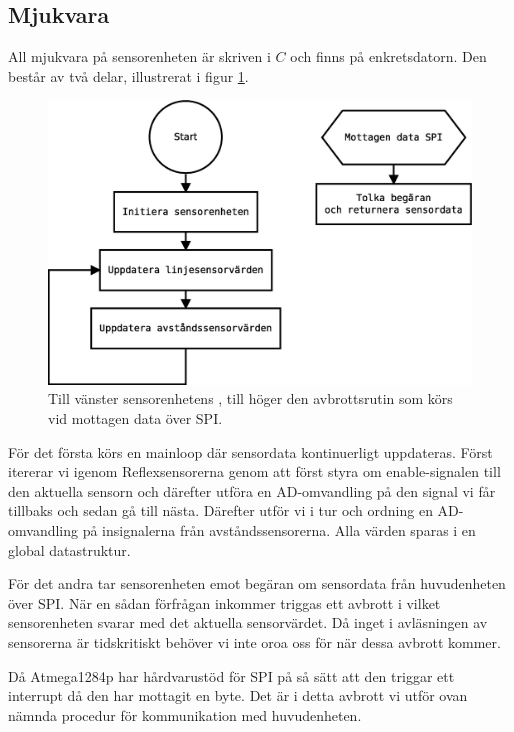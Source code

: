\subsection{Mjukvara}

All mjukvara på sensorenheten är skriven i $C$ och finns på enkretsdatorn. Den består av två delar, illustrerat i figur \ref{sensorenhet-mjukvara}.

\begin{figure}[h!]
	\centering
	\includegraphics[scale=0.4]{grafik/sensorenhet-mjukvara}
	\caption{Till vänster sensorenhetens , till höger den avbrottsrutin som körs vid mottagen data över SPI.} \label{sensorenhet-mjukvara}
\end{figure}

För det första körs en mainloop där sensordata kontinuerligt uppdateras. Först itererar vi igenom Reflexsensorerna genom att först styra om enable-signalen till den aktuella sensorn och därefter utföra en AD-omvandling på den signal vi får tillbaks och sedan gå till nästa. Därefter utför vi i tur och ordning en AD-omvandling på insignalerna från avståndssensorerna. Alla värden sparas i en global datastruktur.

För det andra tar sensorenheten emot begäran om sensordata från huvudenheten över SPI. När en sådan förfrågan inkommer triggas ett avbrott i vilket sensorenheten svarar med det aktuella sensorvärdet. Då inget i avläsningen av sensorerna är tidskritiskt behöver vi inte oroa oss för när dessa avbrott kommer.

Då Atmega1284p har hårdvarustöd för SPI på så sätt att den triggar ett interrupt då den har mottagit en byte. Det är i detta avbrott vi utför ovan nämnda procedur för kommunikation med huvudenheten.

